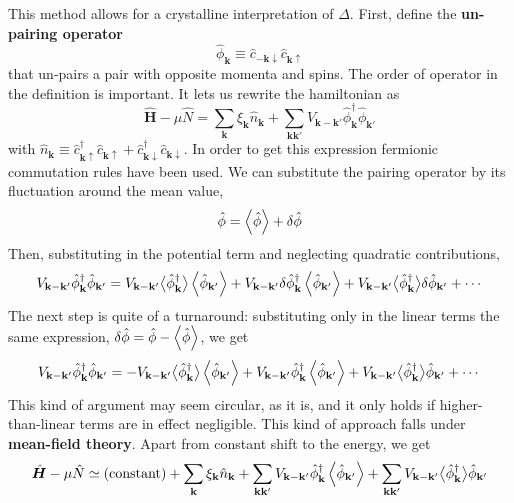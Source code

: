 This method allows for a crystalline interpretation of $\Delta$. First, define the \textbf{un-pairing operator}
\[
	\hat{\phi}_\mathbf{k} \equiv  \hat{c}_{-\mathbf{k}\downarrow} \hat{c}_{\mathbf{k}\uparrow}
\]
that un-pairs a pair with opposite momenta and spins. The order of operator in the definition is important. It lets us rewrite the hamiltonian as
\[
	\hat{\bm H} - \mu\hat{N} = \sum_{\mathbf{k}} \xi_{\mathbf{k}} \hat n_\mathbf{k} + \sum_{\mathbf{k}\mathbf{k}'} V_{\mathbf{k}-\mathbf{k}'} \hat{\phi}_\mathbf{k}^\dagger \hat{\phi}_{\mathbf{k}'}
\]
with $\hat{n}_\mathbf{k} \equiv \hat{c}_{\mathbf{k}\uparrow}^\dagger \hat{c}_{\mathbf{k}\uparrow} + \hat{c}_{\mathbf{k}\downarrow}^\dagger \hat{c}_{\mathbf{k}\downarrow}$. In order to get this expression fermionic commutation rules have been used. We can substitute the pairing operator by its fluctuation around the mean value,
\[
	\hat{\phi} = \ev{\hat{\phi}} + \delta\hat{\phi}
\]
Then, substituting in the potential term and neglecting quadratic contributions,
\[
	V_{\mathbf{k}-\mathbf{k}'} \hat{\phi}_\mathbf{k}^\dagger \hat{\phi}_{\mathbf{k}'} = V_{\mathbf{k}-\mathbf{k}'}  \big\langle\hat{\phi}_\mathbf{k}^\dagger\big\rangle \ev{\hat{\phi}_{\mathbf{k}'}}
	+ V_{\mathbf{k}-\mathbf{k}'} \delta\hat{\phi}_\mathbf{k}^\dagger \ev{\hat{\phi}_{\mathbf{k}'}}
	+ V_{\mathbf{k}-\mathbf{k}'} \big\langle\hat{\phi}_\mathbf{k}^\dagger\big\rangle \delta\hat{\phi}_{\mathbf{k}'}
	+ \cdots
\]
The next step is quite of a turnaround: substituting only in the linear terms the same expression, $\delta\hat{\phi} = \hat{\phi}-\ev{\hat{\phi}}$, we get
\[
	V_{\mathbf{k}-\mathbf{k}'} \hat{\phi}_\mathbf{k}^\dagger \hat{\phi}_{\mathbf{k}'} = - V_{\mathbf{k}-\mathbf{k}'}  \big\langle\hat{\phi}_\mathbf{k}^\dagger\big\rangle \ev{\hat{\phi}_{\mathbf{k}'}}
	+ V_{\mathbf{k}-\mathbf{k}'} \hat{\phi}_\mathbf{k}^\dagger \ev{\hat{\phi}_{\mathbf{k}'}}
	+ V_{\mathbf{k}-\mathbf{k}'} \big\langle\hat{\phi}_\mathbf{k}^\dagger\big\rangle\hat{\phi}_{\mathbf{k}'}
	+ \cdots
\]
This kind of argument may seem circular, as it is, and it only holds if higher-than-linear terms are in effect negligible. This kind of approach falls under \textbf{mean-field theory}. Apart from constant shift to the energy, we get
\[
	\hat{\bm H} - \mu\hat{N} \simeq (\mathrm{constant}) + \sum_{\mathbf{k}} \xi_{\mathbf{k}} \hat n_\mathbf{k} + 
	\sum_{\mathbf{k}\mathbf{k}'} V_{\mathbf{k}-\mathbf{k}'} \hat{\phi}_\mathbf{k}^\dagger \ev{\hat{\phi}_{\mathbf{k}'}} + \sum_{\mathbf{k}\mathbf{k}'} V_{\mathbf{k}-\mathbf{k}'}  \big\langle\hat{\phi}_\mathbf{k}^\dagger \big\rangle \hat{\phi}_{\mathbf{k}'}
\]
